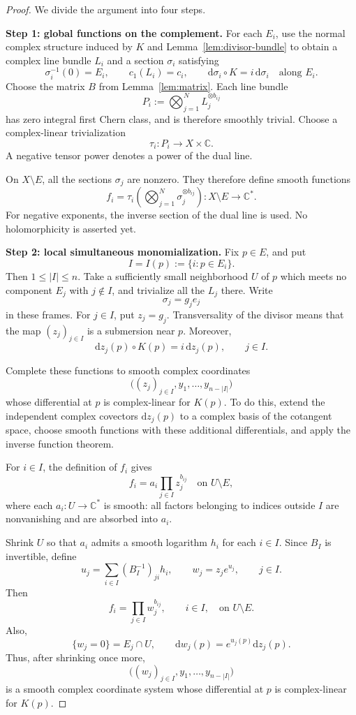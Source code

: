 \documentclass[11pt]{article}
\theoremstyle{definition}
\theoremstyle{remark}
\newcommand{\C}{\mathbb C}
\newcommand{\dd}{\mathrm d}
\begin{document}
\begin{proof}
We divide the argument into four steps.

\medskip
\noindent\textbf{Step 1: global functions on the complement.}
For each $E_i$, use the normal complex structure induced by $K$
and Lemma~\ref{lem:divisor-bundle} to obtain a complex line bundle
$L_i$ and a section $\sigma_i$ satisfying
\[
\sigma_i^{-1}(0)=E_i,\qquad
c_1(L_i)=c_i,\qquad
\dd\sigma_i\circ K=i\,\dd\sigma_i\quad\text{along }E_i.
\]
Choose the matrix $B$ from Lemma~\ref{lem:matrix}.  Each line
bundle
\[
P_i:=\bigotimes_{j=1}^{N}L_j^{\otimes b_{ij}}
\]
has zero integral first Chern class, and is therefore smoothly
trivial.  Choose a complex-linear trivialization
\[
\tau_i:P_i\longrightarrow X\times\C.
\]
A negative tensor power denotes a power of the dual line.

On $X\setminus E$, all the sections $\sigma_j$ are nonzero.
They therefore define smooth functions
\[
f_i
=
\tau_i\!\left(\bigotimes_{j=1}^{N}\sigma_j^{\otimes b_{ij}}\right)
:
X\setminus E\longrightarrow\C^*.
\]
For negative exponents, the inverse section of the dual line
is used.  No holomorphicity is asserted yet.

\medskip
\noindent\textbf{Step 2: local simultaneous monomialization.}
Fix $p\in E$, and put
\[
I=I(p):=\{i:p\in E_i\}.
\]
Then $1\leq |I|\leq n$.  Take a sufficiently small neighborhood
$U$ of $p$ which meets no component $E_j$ with $j\notin I$,
and trivialize all the $L_j$ there.  Write
\[
\sigma_j=g_j e_j
\]
in these frames.  For $j\in I$, put $z_j=g_j$.
Transversality of the divisor means that the map
$(z_j)_{j\in I}$ is a submersion near $p$.  Moreover,
\[
\dd z_j(p)\circ K(p)=i\,\dd z_j(p),\qquad j\in I.
\]

Complete these functions to smooth complex coordinates
\[
\bigl((z_j)_{j\in I},y_1,\ldots,y_{n-|I|}\bigr)
\]
whose differential at $p$ is complex-linear for $K(p)$.
To do this, extend the independent complex covectors
$\dd z_j(p)$ to a complex basis of the cotangent space, choose
smooth functions with these additional differentials, and
apply the inverse function theorem.

For $i\in I$, the definition of $f_i$ gives
\[
f_i=a_i\prod_{j\in I}z_j^{b_{ij}}
\quad\text{on }U\setminus E,
\]
where each $a_i:U\to\C^*$ is smooth: all factors belonging to
indices outside $I$ are nonvanishing and are absorbed into
$a_i$.

Shrink $U$ so that $a_i$ admits a smooth logarithm $h_i$ for
each $i\in I$.  Since $B_I$ is invertible, define
\[
u_j=\sum_{i\in I}(B_I^{-1})_{ji}h_i,\qquad
w_j=z_j e^{u_j},\qquad j\in I.
\]
Then
\begin{equation}\label{eq:monomial}
f_i=\prod_{j\in I}w_j^{b_{ij}},
\qquad i\in I,
\quad\text{on }U\setminus E.
\end{equation}
Also,
\[
\{w_j=0\}=E_j\cap U,\qquad
\dd w_j(p)=e^{u_j(p)}\dd z_j(p).
\]
Thus, after shrinking once more,
\[
\bigl((w_j)_{j\in I},y_1,\ldots,y_{n-|I|}\bigr)
\]
is a smooth complex coordinate system whose differential at
$p$ is complex-linear for $K(p)$.


\end{proof}
\end{document}
